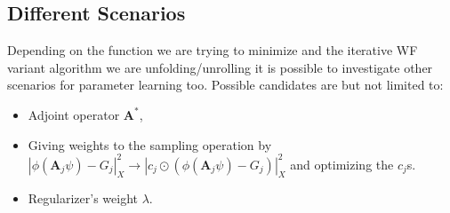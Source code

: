 \subsection*{Different Scenarios}

Depending on the function we are trying to minimize and the iterative \ac{WF}\cite{Jaganathan2015}\cite{Liu2019} variant algorithm we are unfolding/unrolling 
it is possible to investigate other scenarios for parameter learning too. Possible candidates are but not limited to:

\begin{itemize}
  \item Adjoint operator $\boldsymbol{A}^*$,
  \item Giving weights to the sampling operation by $\left|\phi(\boldsymbol{A}_j\psi)-G_j\right|_X^2 \rightarrow \left|c_j \odot \left(\phi(\boldsymbol{A}_j\psi)-G_j\right)\right|_X^2$ and optimizing the $c_j$s.
  \item Regularizer's weight $\lambda$.
\end{itemize}














